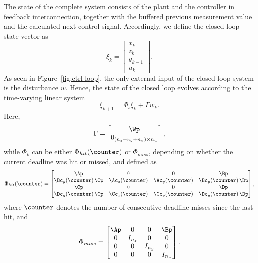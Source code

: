 The state of the complete system consists of the plant and the controller in feedback interconnection, together with the buffered previous measurement value and the calculated next control signal.
Accordingly, we define the closed-loop state vector as
\begin{equation*}
    \xi_k = \begin{bmatrix} x_k \\ z_k \\ y_{k-1} \\ u_k \end{bmatrix} .
\end{equation*}
As seen in Figure~\ref{fig:ctrl-loop}, the only external input of the closed-loop system is the disturbance $w$.
Hence, the state of the closed loop evolves according to the time-varying linear system
\begin{equation}
    \label{eq:cl-system}
    \xi_{k+1} = \Phi_{k} \xi_k + \Gamma w_k.
\end{equation}
Here,
\begin{equation*}
    \Gamma = \begin{bmatrix} \Wp \\ 0_{(n_z+n_y+n_u) \times n_w} \end{bmatrix},
\end{equation*}
while $\Phi_k$ can be either $\Phi_{hit}(\counter)$ or $\Phi_{miss}$, depending on whether the current deadline was hit or missed, and defined as
\begin{equation*}
    \Phi_{hit}(\counter) = \begin{bmatrix} \Ap & 0 & 0 & \Bp \\
    \Bc_y(\counter) \, \Cp & \Ac_z(\counter) & \Ac_y(\counter) & \Bc_y(\counter) \, \Dp \\
    \Cp & 0 & 0 & \Dp \\
    \Dc_y(\counter) \, \Cp & \Cc_z(\counter) & \Cc_y(\counter) & \Dc_y(\counter) \, \Dp
    \end{bmatrix},
\end{equation*}
where $\counter$ denotes the number of consecutive deadline misses since the last hit, and
\begin{equation*}
    \Phi_{miss} = \begin{bmatrix} \Ap & 0 & 0 & \Bp \\
    0 & I_{n_z} & 0 & 0 \\
    0 & 0 & I_{n_y} & 0 \\
    0 & 0 & 0 & I_{n_u} \end{bmatrix}.
\end{equation*}

